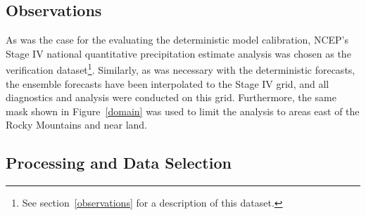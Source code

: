 \subsection{Observations}
\label{eobservations}

As was the case for the evaluating the deterministic model calibration, NCEP's Stage IV national quantitative precipitation estimate analysis was chosen as the verification dataset\footnote{See \mbox{section \ref{observations}} for a description of this dataset.}.
Similarly, as was necessary with the deterministic forecasts, the ensemble forecasts have been interpolated to the Stage IV grid, and all diagnostics and analysis were conducted on this grid.
Furthermore, the same mask shown in \mbox{Figure \ref{domain}} was used to limit the analysis to areas east of the Rocky Mountains and near land.




\subsection{Processing and Data Selection}
\label{eprocessing}


